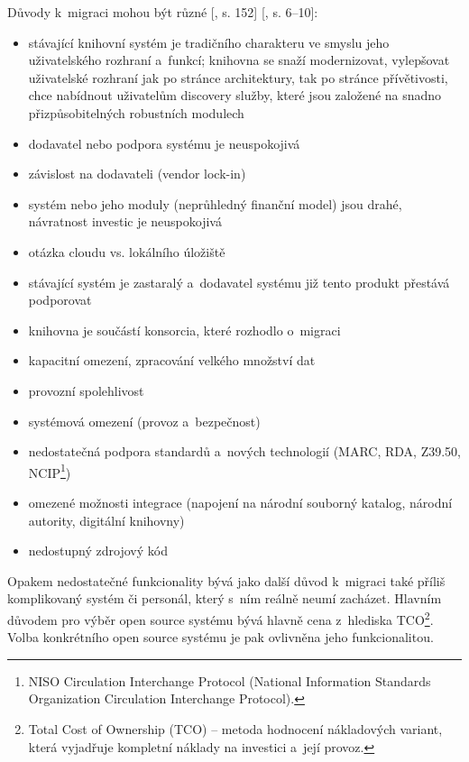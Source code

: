 \documentclass[
	11pt, oneside, printed, final, palatino
	microtype,
	table,   %
	lof,     %
	lot     %
]{fithesis3}
\newcommand{\citepages}[2]{[\cite{#2}, s. #1]}
\newcommand{\mezera}{\bigskip}
\begin{document}
{Důvody k~migraci mohou být různé \citepages{152}{bilal_2014} \citepages{6–10}{bartosek_2002}:
\mezera
\begin{itemize}
\item stávající knihovní systém je tradičního charakteru ve smyslu jeho uživatelského rozhraní a~funkcí; knihovna se snaží modernizovat, vylepšovat uživatelské rozhraní jak po stránce architektury, tak po stránce přívětivosti, chce nabídnout uživatelům discovery služby, které jsou založené na snadno přizpůsobitelných robustních modulech
\item dodavatel nebo podpora systému je neuspokojivá
\item závislost na dodavateli (vendor lock-in)
\item systém nebo jeho moduly (neprůhledný finanční model) jsou drahé, návratnost investic je neuspokojivá
\item otázka cloudu vs. lokálního úložiště
\item stávající systém je zastaralý a~dodavatel systému již tento produkt přestává podporovat
\item knihovna je součástí konsorcia, které rozhodlo o~migraci
\item kapacitní omezení, zpracování velkého množství dat
\item provozní spolehlivost
\item systémová omezení (provoz a~bezpečnost)
\item nedostatečná podpora standardů a~nových technologií (MARC, RDA, Z39.50, NCIP\footnote{NISO Circulation Interchange Protocol (National Information Standards Organization Circulation Interchange Protocol).})
\item omezené možnosti integrace (napojení na národní souborný katalog, národní autority, digitální knihovny)
\item nedostupný zdrojový kód
\end{itemize}

Opakem nedostatečné funkcionality bývá jako další důvod k~migraci také příliš komplikovaný systém či personál, který s~ním reálně neumí zacházet. Hlavním důvodem pro výběr open source systému bývá hlavně cena z~hlediska TCO\footnote{Total Cost of Ownership (TCO) – metoda hodnocení nákladových variant, která vyjadřuje kompletní náklady na investici a~její provoz.}. Volba konkrétního open source systému je pak ovlivněna jeho funkcionalitou.

}
\end{document}
